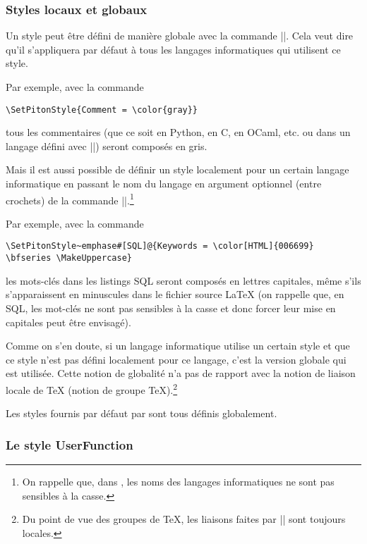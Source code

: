 \documentclass[dvipsnames,svgnames]{article}
\begin{document}
\subsubsection{Styles locaux et globaux}

Un style peut être défini de manière globale avec la commande |\SetPitonStyle|. Cela veut dire qu'il s'appliquera
par défaut à tous les langages informatiques qui utilisent ce style.

\medskip
Par exemple, avec la commande 
\begin{Verbatim}
\SetPitonStyle{Comment = \color{gray}}
\end{Verbatim}
tous les commentaires (que ce soit en Python, en C, en OCaml, etc. ou dans un langage défini avec
|\NewPitonLanguage|) seront composés en gris. 

\bigskip
Mais il est aussi possible de définir un style localement pour un certain langage informatique en passant le nom du
langage en argument optionnel (entre crochets) de la commande |\SetPitonStyle|.\footnote{On rappelle que, dans
  , les noms des langages informatiques ne sont pas sensibles à la casse.}

\medskip
Par exemple, avec la commande 
\begin{Verbatim}
\SetPitonStyle~emphase#[SQL]@{Keywords = \color[HTML]{006699} \bfseries \MakeUppercase}
\end{Verbatim}
les mots-clés dans les listings SQL seront composés en lettres capitales, même s'ils s'apparaissent en minuscules
dans le fichier source LaTeX (on rappelle que, en SQL, les mot-clés ne sont pas sensibles à la casse et donc forcer
leur mise en capitales peut être envisagé).

\medskip
Comme on s'en doute, si un langage informatique utilise un certain style et que ce style n'est pas défini
localement pour ce langage, c'est la version globale qui est utilisée. Cette notion de globalité n'a pas de
rapport avec la notion de liaison locale de TeX (notion de groupe TeX).\footnote{Du point de vue des groupes de
  TeX, les liaisons faites par |\SetPitonStyle| sont toujours locales.}

\medskip
Les styles fournis par défaut par  sont tous définis globalement.

\bigskip
\subsubsection{Le style UserFunction}

\end{document}
